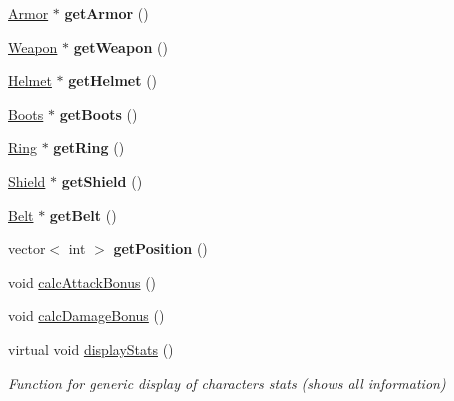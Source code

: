 \begin{DoxyCompactItemize}
\hyperlink{class_armor}{Armor} $\ast$ {\bfseries get\+Armor} ()
\item 
\hypertarget{class_characters_a9008fe044c9ed62fdfdfc08bd09cbc26}{}\label{class_characters_a9008fe044c9ed62fdfdfc08bd09cbc26} 
\hyperlink{class_weapon}{Weapon} $\ast$ {\bfseries get\+Weapon} ()
\item 
\hypertarget{class_characters_a93f2eeae332dfaef92605410fda3c77d}{}\label{class_characters_a93f2eeae332dfaef92605410fda3c77d} 
\hyperlink{class_helmet}{Helmet} $\ast$ {\bfseries get\+Helmet} ()
\item 
\hypertarget{class_characters_a93d02cbc7494a7fe7abe1d3a4fcc9b42}{}\label{class_characters_a93d02cbc7494a7fe7abe1d3a4fcc9b42} 
\hyperlink{class_boots}{Boots} $\ast$ {\bfseries get\+Boots} ()
\item 
\hypertarget{class_characters_ace71da180996d5101a30ebfc2aca8a79}{}\label{class_characters_ace71da180996d5101a30ebfc2aca8a79} 
\hyperlink{class_ring}{Ring} $\ast$ {\bfseries get\+Ring} ()
\item 
\hypertarget{class_characters_a2d01b90239043a157c56e625b78017cd}{}\label{class_characters_a2d01b90239043a157c56e625b78017cd} 
\hyperlink{class_shield}{Shield} $\ast$ {\bfseries get\+Shield} ()
\item 
\hypertarget{class_characters_a0f32959981f93b31889eed35f257f4c6}{}\label{class_characters_a0f32959981f93b31889eed35f257f4c6} 
\hyperlink{class_belt}{Belt} $\ast$ {\bfseries get\+Belt} ()
\item 
\hypertarget{class_characters_aea3ce859280087ef57932ff212d96749}{}\label{class_characters_aea3ce859280087ef57932ff212d96749} 
vector$<$ int $>$ {\bfseries get\+Position} ()
\item 
void \hyperlink{class_characters_aafcca03cc72ce2b389c0412229864c6e}{calc\+Attack\+Bonus} ()
\item 
void \hyperlink{class_characters_af750209704e0be8b911cbc29fc1362ee}{calc\+Damage\+Bonus} ()
\item 
\hypertarget{class_characters_adc5a2d1c1aabab2b9915f5ce0e2707f9}{}\label{class_characters_adc5a2d1c1aabab2b9915f5ce0e2707f9} 
virtual void \hyperlink{class_characters_adc5a2d1c1aabab2b9915f5ce0e2707f9}{display\+Stats} ()
\begin{DoxyCompactList}\small\item\em Function for generic display of character\textquotesingle{}s stats (shows all information) \end{DoxyCompactList}\item 
\hypertarget{class_characters_acf1c5f4228c0ac33361c0ad5211aa7a9}{}\label{class_characters_acf1c5f4228c0ac33361c0ad5211aa7a9} 

\end{DoxyCompactItemize}
